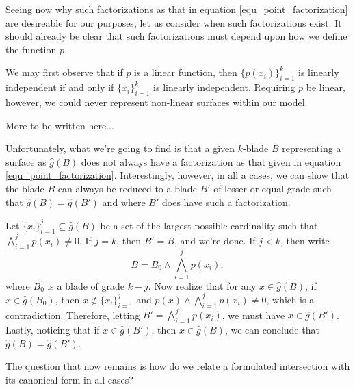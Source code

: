\documentclass{birkjour}
\theoremstyle{definition}
\theoremstyle{remark}
\numberwithin{equation}{section}
\newcommand{\gh}{\hat{g}}
\begin{document}
Seeing now why such factorizations as that in equation \eqref{equ_point_factorization} are desireable for
our purposes, let us consider when such factorizations exist.  It should already be clear that
such factorizations must depend upon how we define the function $p$.

We may first observe that if $p$ is a linear function, then $\{p(x_i)\}_{i=1}^k$ is linearly
independent if and only if $\{x_i\}_{i=1}^k$ is linearly independent.
Requiring $p$ be linear, however, we could never represent non-linear surfaces within
our model.

More to be written here...

Unfortunately, what we're going to find is that a given $k$-blade $B$ representing
a surface as $\gh(B)$ does not always have a factorization as that
given in equation \eqref{equ_point_factorization}.  Interestingly, however,
in all a cases, we can show that the blade $B$ can always be reduced to a blade
$B'$ of lesser or equal grade such that $\gh(B)=\gh(B')$ and where $B'$ does have
such a factorization.

Let $\{x_i\}_{i=1}^j\subseteq\gh(B)$ be a set of the largest possible cardinality such that
$\bigwedge_{i=1}^j p(x_i)\neq 0$.  If $j=k$, then $B'=B$, and we're done.  If $j<k$,
then write
\begin{equation*}
B = B_0\wedge\bigwedge_{i=1}^j p(x_i),
\end{equation*}
where $B_0$ is a blade of grade $k-j$.  Now realize that for any $x\in\gh(B)$, if
$x\in\gh(B_0)$, then $x\not\in\{x_i\}_{i=1}^j$ and $p(x)\wedge\bigwedge_{i=1}^j p(x_i)\neq 0$,
which is a contradiction.  Therefore, letting $B'=\bigwedge_{i=1}^j p(x_i)$,
we must have $x\in\gh(B')$.  Lastly, noticing that if $x\in\gh(B')$, then $x\in\gh(B)$,
we can conclude that $\gh(B)=\gh(B')$.

The question that now remains is how do we relate a formulated intersection with
its canonical form in all cases?


\end{document}
